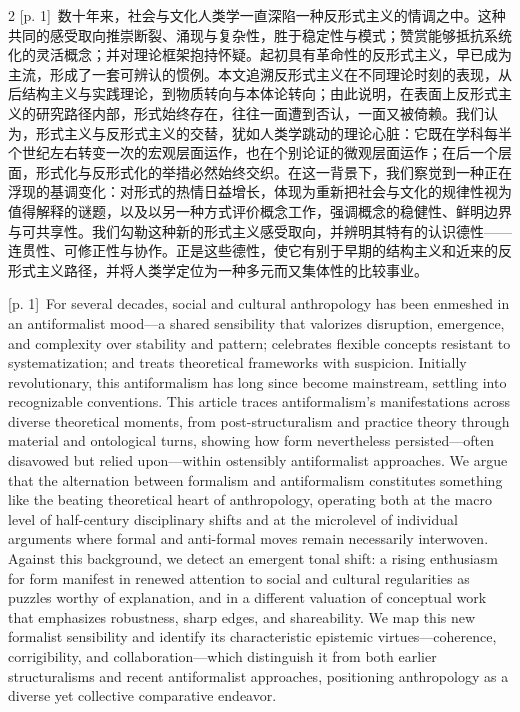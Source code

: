 \documentclass[10pt,a4paper]{article}
\begin{document}
\begin{paracol}{2}
{\scriptsize\color{gray} [p. 1]}\ 数十年来，社会与文化人类学一直深陷一种反形式主义的情调之中。这种共同的感受取向推崇断裂、涌现与复杂性，胜于稳定性与模式；赞赏能够抵抗系统化的灵活概念；并对理论框架抱持怀疑。起初具有革命性的反形式主义，早已成为主流，形成了一套可辨认的惯例。本文追溯反形式主义在不同理论时刻的表现，从后结构主义与实践理论，到物质转向与本体论转向；由此说明，在表面上反形式主义的研究路径内部，形式始终存在，往往一面遭到否认，一面又被倚赖。我们认为，形式主义与反形式主义的交替，犹如人类学跳动的理论心脏：它既在学科每半个世纪左右转变一次的宏观层面运作，也在个别论证的微观层面运作；在后一个层面，形式化与反形式化的举措必然始终交织。在这一背景下，我们察觉到一种正在浮现的基调变化：对形式的热情日益增长，体现为重新把社会与文化的规律性视为值得解释的谜题，以及以另一种方式评价概念工作，强调概念的稳健性、鲜明边界与可共享性。我们勾勒这种新的形式主义感受取向，并辨明其特有的认识德性——连贯性、可修正性与协作。正是这些德性，使它有别于早期的结构主义和近来的反形式主义路径，并将人类学定位为一种多元而又集体性的比较事业。\par
\switchcolumn
{\scriptsize\color{gray} [p. 1]}\ For several decades, social and cultural anthropology has been enmeshed in an antiformalist mood—a shared sensibility that valorizes disruption, emergence, and complexity over stability and pattern; celebrates flexible concepts resistant to systematization; and treats theoretical frameworks with suspicion. Initially revolutionary, this antiformalism has long since become mainstream, settling into recognizable conventions. This article traces antiformalism’s manifestations across diverse theoretical moments, from post-structuralism and practice theory through material and ontological turns, showing how form nevertheless persisted—often disavowed but relied upon—within ostensibly antiformalist approaches. We argue that the alternation between formalism and antiformalism constitutes something like the beating theoretical heart of anthropology, operating both at the macro level of half-century disciplinary shifts and at the microlevel of individual arguments where formal and anti-formal moves remain necessarily interwoven. Against this background, we detect an emergent tonal shift: a rising enthusiasm for form manifest in renewed attention to social and cultural regularities as puzzles worthy of explanation, and in a different valuation of conceptual work that emphasizes robustness, sharp edges, and shareability. We map this new formalist sensibility and identify its characteristic epistemic virtues—coherence, corrigibility, and collaboration—which distinguish it from both earlier structuralisms and recent antiformalist approaches, positioning anthropology as a diverse yet collective comparative endeavor.\par

\end{paracol}
\end{document}
